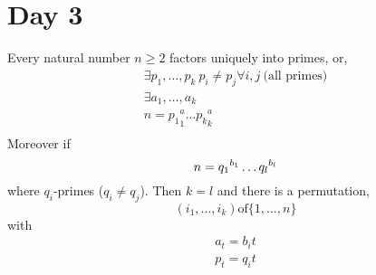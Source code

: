 \documentclass[../notes.tex]{subfiles}
\begin{document}
\section{Day 3}
\begin{theorem}
    Every natural number $n\geq 2$ factors uniquely into primes,
    or,
    \begin{align*}
        \exists p_1,\dots,p_k\ p_i\neq p_j\forall i,j\ \text{(all primes)}\\
        \exists a_1,\dots,a_k\\
        n={p_1}^a_1\dots {p_k}^a_k\\
    \end{align*}
    Moreover if
    \[
        n={q_1}^{b_1}\dots {q_l}^{b_l}\\
    \]
    where $q_i$-primes ($q_i\neq q_j$). Then
    $k=l$ and there is a permutation,
    \[
        (i_1,\dots,i_k) \text{of} \{1,\dots,n\}
    \]
    with
    \begin{align*}
        a_t=b_it\\
        p_t=q_it\\
    \end{align*}
\end{theorem}
\end{document}
